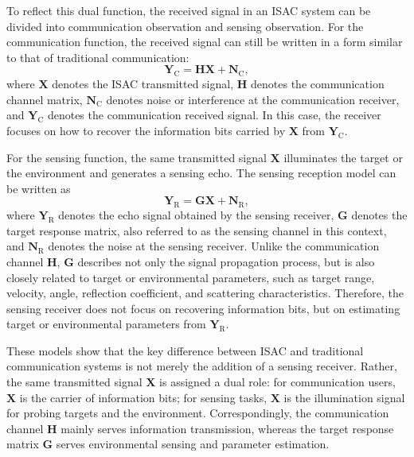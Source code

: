 To reflect this dual function,
the received signal in an ISAC system can be divided into communication observation
and sensing observation.
For the communication function,
the received signal can still be written in a form similar to that of traditional communication:
\begin{equation}
    \mathbf{Y}_{\mathrm{C}}
    =
    \mathbf{H}\mathbf{X}
    +
    \mathbf{N}_{\mathrm{C}},
    \label{eq:isac_communication_model}
\end{equation}
where \(\mathbf{X}\) denotes the ISAC transmitted signal,
\(\mathbf{H}\) denotes the communication channel matrix,
\(\mathbf{N}_{\mathrm{C}}\) denotes noise or interference at the communication receiver,
and \(\mathbf{Y}_{\mathrm{C}}\) denotes the communication received signal.
In this case,
the receiver focuses on how to recover the information bits carried by \(\mathbf{X}\)
from \(\mathbf{Y}_{\mathrm{C}}\).

For the sensing function,
the same transmitted signal \(\mathbf{X}\) illuminates the target or the environment
and generates a sensing echo.
The sensing reception model can be written as
\begin{equation}
    \mathbf{Y}_{\mathrm{R}}
    =
    \mathbf{G}\mathbf{X}
    +
    \mathbf{N}_{\mathrm{R}},
    \label{eq:isac_sensing_model}
\end{equation}
where \(\mathbf{Y}_{\mathrm{R}}\) denotes the echo signal obtained by the sensing receiver,
\(\mathbf{G}\) denotes the target response matrix,
also referred to as the sensing channel in this context,
and \(\mathbf{N}_{\mathrm{R}}\) denotes the noise at the sensing receiver.
Unlike the communication channel \(\mathbf{H}\),
\(\mathbf{G}\) describes not only the signal propagation process,
but is also closely related to target or environmental parameters,
such as target range,
velocity,
angle,
reflection coefficient,
and scattering characteristics.
Therefore,
the sensing receiver does not focus on recovering information bits,
but on estimating target or environmental parameters from \(\mathbf{Y}_{\mathrm{R}}\).

These models show that the key difference between ISAC and traditional communication systems
is not merely the addition of a sensing receiver.
Rather,
the same transmitted signal \(\mathbf{X}\) is assigned a dual role:
for communication users,
\(\mathbf{X}\) is the carrier of information bits;
for sensing tasks,
\(\mathbf{X}\) is the illumination signal for probing targets and the environment.
Correspondingly,
the communication channel \(\mathbf{H}\) mainly serves information transmission,
whereas the target response matrix \(\mathbf{G}\) serves environmental sensing
and parameter estimation.

